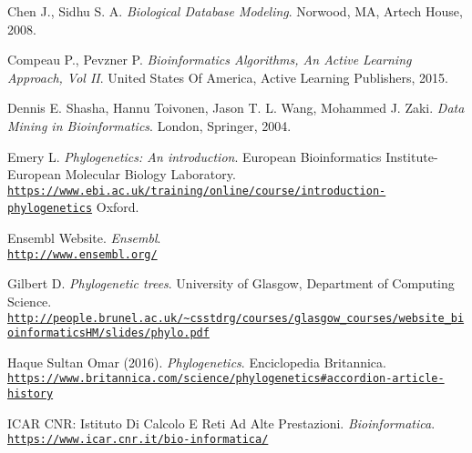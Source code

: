 \documentclass[twoside,openright,titlepage,fleqn,
,	headinclude,12pt,a4paper,BCOR5mm,footinclude,table]{scrbook}
\newcommand{\?}{'\-\nobreak\hspace{0pt}}
\begin{document}
\begin{thebibliography}{50}
Chen J., Sidhu S. A.\newline
\textit{Biological Database Modeling}.\newline
Norwood, MA, Artech House, 2008.

Compeau P., Pevzner P. \newline
\textit{Bioinformatics Algorithms, An Active Learning Approach, Vol II}. \newline
United States Of America, Active Learning Publishers, 2015.

Dennis E. Shasha, Hannu Toivonen, Jason T. L. Wang, Mohammed J. Zaki. \newline
\textit{Data Mining in Bioinformatics}.\newline
London, Springer, 2004.

Emery L.\newline
\textit{Phylogenetics: An introduction}.\newline
European Bioinformatics Institute-European Molecular Biology Laboratory.
\\\texttt{\url{https://www.ebi.ac.uk/training/online/course/introduction-phylogenetics}}\newline
Oxford.

Ensembl Website.\newline
\textit{Ensembl}.
\\\texttt{\url{http://www.ensembl.org/}}

Gilbert D. \newline
\textit{Phylogenetic trees}.\newline
University of Glasgow, Department of Computing Science.
\\\texttt{\url{http://people.brunel.ac.uk/~csstdrg/courses/glasgow_courses/website_bioinformaticsHM/slides/phylo.pdf}}

Haque Sultan Omar (2016).\newline
\textit{Phylogenetics}.\newline
Enciclopedia Britannica.
\\\texttt{\url{https://www.britannica.com/science/phylogenetics\#accordion-article-history}}

ICAR CNR: Istituto Di Calcolo E Reti Ad Alte Prestazioni.\newline
\textit{Bioinformatica}.
\\\texttt{\url{https://www.icar.cnr.it/bio-informatica/}}


\end{thebibliography}
\end{document}
